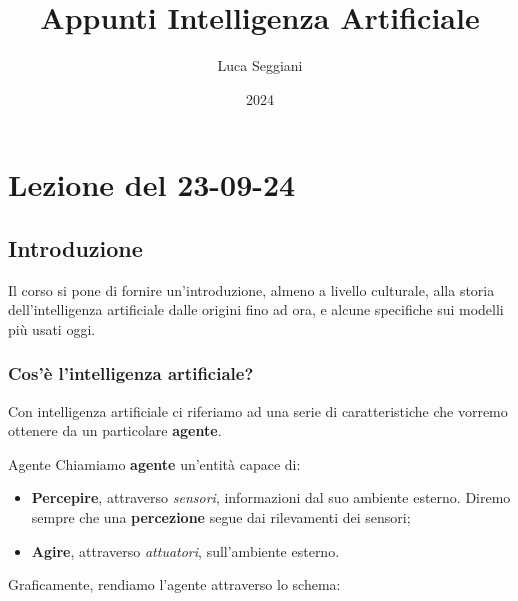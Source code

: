 \documentclass[a4paper,11pt]{article}
\title{Appunti Intelligenza Artificiale}
\author{Luca Seggiani}
\date{2024}
\begin{document}
\section{Lezione del 23-09-24}

\thispagestyle{empty}
\pagestyle{fancy}

\subsection{Introduzione}
Il corso si pone di fornire un'introduzione, almeno a livello culturale, alla storia dell'intelligenza artificiale dalle origini fino ad ora, e alcune specifiche sui modelli più usati oggi.


\subsubsection{Cos'è l'intelligenza artificiale?}
Con intelligenza artificiale ci riferiamo ad una serie di caratteristiche che vorremo ottenere da un particolare \textbf{agente}.
\begin{definition}{Agente}
	Chiamiamo \textbf{agente} un'entità capace di:
\begin{itemize}
	\item \textbf{Percepire}, attraverso \textit{sensori}, informazioni dal suo ambiente esterno. Diremo sempre che una \textbf{percezione} segue dai rilevamenti dei sensori;
	\item \textbf{Agire}, attraverso \textit{attuatori}, sull'ambiente esterno.
\end{itemize}
\end{definition}

Graficamente, rendiamo l'agente attraverso lo schema:
\end{document}
